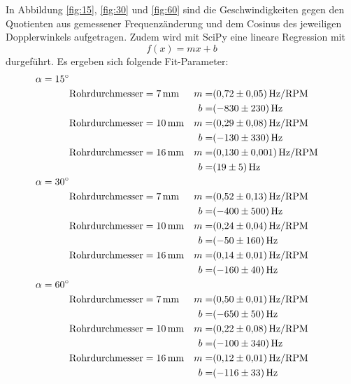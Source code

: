 In Abbildung \ref{fig:15}, \ref{fig:30} und \ref{fig:60} sind die Geschwindigkeiten gegen den Quotienten aus gemessener Frequenzänderung und dem Cosinus des jeweiligen
Dopplerwinkels aufgetragen.
Zudem wird mit SciPy eine lineare Regression mit
\begin{equation}
  f(x)= mx + b
\end{equation}
durgeführt.
Es ergeben sich folgende Fit-Parameter:
\begin{align*}
	\alpha = \SI{15}{\degree} 	& \\
								& \text{Rohrdurchmesser}=\SI{7}{\milli\meter} 	& m=&\SI{0.72\pm0.05}{\hertz\per RPM}\\
								&												& b=&\SI{-830\pm230}{\hertz}\\
								& \text{Rohrdurchmesser}=\SI{10}{\milli\meter} 	& m=&\SI{0.29\pm0.08}{\hertz\per RPM}\\
								&												& b=&\SI{-130\pm330}{\hertz}\\
								& \text{Rohrdurchmesser}=\SI{16}{\milli\meter} 	& m=&\SI{0.130\pm0.001}{\hertz\per RPM}\\
								&												& b=&\SI{19\pm5}{\hertz}\\
	\alpha = \SI{30}{\degree} 	& \\
								& \text{Rohrdurchmesser}=\SI{7}{\milli\meter} 	& m=&\SI{0.52\pm0.13}{\hertz\per RPM}\\
								&												& b=&\SI{-400\pm500}{\hertz}\\
								& \text{Rohrdurchmesser}=\SI{10}{\milli\meter} 	& m=&\SI{0.24\pm0.04}{\hertz\per RPM}\\
								&												& b=&\SI{-50\pm160}{\hertz}\\
								& \text{Rohrdurchmesser}=\SI{16}{\milli\meter} 	& m=&\SI{0.14\pm0.01}{\hertz\per RPM}\\
								&												& b=&\SI{-160\pm40}{\hertz}\\
	\alpha = \SI{60}{\degree} 	& \\
								& \text{Rohrdurchmesser}=\SI{7}{\milli\meter} 	& m=&\SI{0.50\pm0.01}{\hertz\per RPM}\\
								&												& b=&\SI{-650\pm50}{\hertz}\\
								& \text{Rohrdurchmesser}=\SI{10}{\milli\meter} 	& m=&\SI{0.22\pm0.08}{\hertz\per RPM}\\
								&												& b=&\SI{-100\pm340}{\hertz}\\
								& \text{Rohrdurchmesser}=\SI{16}{\milli\meter} 	& m=&\SI{0.12\pm0.01}{\hertz\per RPM}\\
								&												& b=&\SI{-116\pm33}{\hertz}\\
\end{align*}


